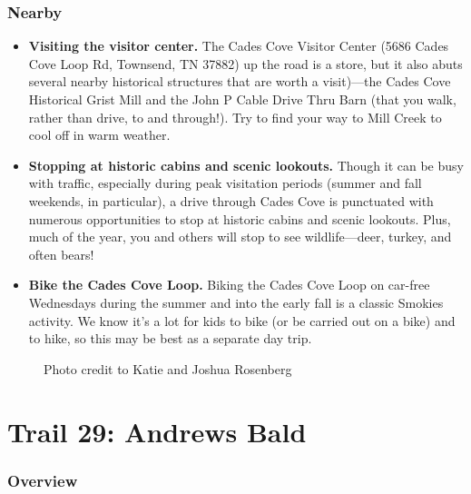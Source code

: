 \documentclass[
  letterpaper,
  DIV=11,
  numbers=noendperiod]{scrreprt}
\makeatletter
\providecommand{\tightlist}{%
  \setlength{\itemsep}{0pt}\setlength{\parskip}{0pt}}\usepackage{longtable,booktabs,array}
\newcommand*\pandocbounded[1]{%
  \sbox\pandoc@box{#1}%
  \Gscale@div\@tempa{\textheight}{\dimexpr\ht\pandoc@box+\dp\pandoc@box\relax}%
  \Gscale@div\@tempb{\linewidth}{\wd\pandoc@box}%
  \ifdim\@tempb\p@<\@tempa\p@\let\@tempa\@tempb\fi%
  \ifdim\@tempa\p@<\p@\scalebox{\@tempa}{\usebox\pandoc@box}%
  \else\usebox{\pandoc@box}%
  \fi%
}
\makeatother
\begin{document}
\subsection{Nearby}\label{nearby-27}

\begin{itemize}
\tightlist
\item
  \textbf{Visiting the visitor center.} The Cades Cove Visitor Center
  (5686 Cades Cove Loop Rd, Townsend, TN 37882) up the road is a store,
  but it also abuts several nearby historical structures that are worth
  a visit)---the Cades Cove Historical Grist Mill and the John P Cable
  Drive Thru Barn (that you walk, rather than drive, to and through!).
  Try to find your way to Mill Creek to cool off in warm weather.
\item
  \textbf{Stopping at historic cabins and scenic lookouts.} Though it
  can be busy with traffic, especially during peak visitation periods
  (summer and fall weekends, in particular), a drive through Cades Cove
  is punctuated with numerous opportunities to stop at historic cabins
  and scenic lookouts. Plus, much of the year, you and others will stop
  to see wildlife---deer, turkey, and often bears!
\item
  \textbf{Bike the Cades Cove Loop.} Biking the Cades Cove Loop on
  car-free Wednesdays during the summer and into the early fall is a
  classic Smokies activity. We know it's a lot for kids to bike (or be
  carried out on a bike) and to hike, so this may be best as a separate
  day trip.
\end{itemize}

\begin{figure}[H]

{\centering \pandocbounded{\texttt{[image: img/jonah-horse.jpeg]}}

}

\caption{Photo credit to Katie and Joshua Rosenberg}

\end{figure}%

\chapter{Trail 29: Andrews Bald}\label{trail-29-andrews-bald}

\subsection{Overview}\label{overview-29}
\end{document}

